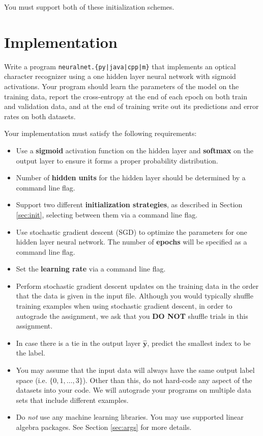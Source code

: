 \documentclass[11pt,addpoints,answers]{exam}
\newcommand{\yv}{\mathbf{y}}
\begin{document}
You must support both of these initialization schemes.

\section{Implementation}
\label{sec:model}
Write a program \texttt{neuralnet.\{py|java|cpp|m\}} that implements an optical character recognizer using a one hidden layer neural network with sigmoid activations. Your program should learn the parameters of the model on the training data, report the cross-entropy at the end of each epoch on both train and validation data, and at the end of training write out its predictions and error rates on both datasets. 
%

Your implementation must satisfy the following requirements:

\begin{itemize}
    \item Use a {\bf sigmoid} activation function on the hidden layer and {\bf softmax} on the  output layer to ensure it forms a proper probability distribution.
    \item Number of {\bf hidden units} for the hidden layer should be determined by a command line flag.
    \item Support two different {\bf initialization strategies}, as described in Section \ref{sec:init}, selecting between them via a command line flag.
    \item Use stochastic gradient descent (SGD) to optimize the parameters for one hidden layer neural network. The number of {\bf epochs} will be specified as a command line flag. 
    \item Set the {\bf learning rate} via a command line flag.
    \item Perform stochastic gradient descent updates on the training data in the order that the data is given in the input file. Although you would typically shuffle training examples when using stochastic gradient descent, in order to autograde the assignment, we ask that you {\bf DO NOT} shuffle trials in this assignment.
    \item In case there is a tie in the output layer $\hat{\yv}$, predict the smallest index to be the label.
    \item You may assume that the input data will always have the same output label space (i.e. $\{0,1,\ldots,3\}$). Other than this, do not hard-code any aspect of the datasets into your code. We will autograde your programs on multiple data sets that include different examples.
    \item Do \emph{not} use any machine learning libraries. You may use supported linear algebra packages. See Section \ref{sec:args} for more details.
\end{itemize}
\end{document}
